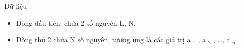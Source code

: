 Dữ liệu
\begin{itemize}
	\item     Dòng đầu tiên: chứa 2 số nguyên L, N.   
	\item     Dòng thứ 2 chứa N số nguyên, tương ứng là các giá trị a    $_     1    $    , a    $_     2    $    , …, a    $_     n    $    .   
\end{itemize}